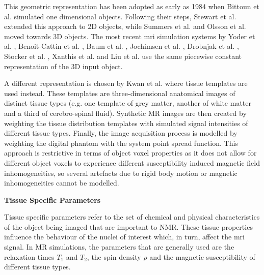 This geometric representation has been adopted as early as 1984 when Bittoun et al. \cite{Bittoun1984} simulated one dimensional objects.
Following their steps, Stewart et al. \cite{Stewart1986} extended this approach to 2D objects, while Summers et al. \cite{Summers1986} and Olsson et al. \cite{Olsson1995} moved towards 3D objects.
The most recent \ac{mri} simulation systems by 
Yoder et al. \cite{Yoder2004}, 
Benoit-Cattin et al. \cite{Benoit-Cattin2005}, 
Baum et al. \cite{Baum2011}, 
Jochimsen et al. \cite{Jochimsen2004} \cite{Jochimsen2006}, 
Drobnjak et al. \cite{Drobnjak2006} \cite{Drobnjak2010}, 
Stocker et al. \cite{Stocker2010}, 
Xanthis et al. \cite{Xanthis2014} and 
Liu et al. \cite{Liu2013} \cite{Liu2014} \cite{Liu2016} \cite{Liu2017} use the same piecewise constant representation of the 3D input object.

\hfill

A different representation is chosen by
Kwan et al. \cite{Kwan1997} \cite{Kwan1999}
where tissue templates \cite{Collins1995} are used instead.
These templates are three-dimensional anatomical images of distinct tissue types (e.g. one template of grey matter, another of white matter and a third of cerebro-spinal fluid). 
Synthetic MR images are then created by weighting the tissue distribution templates with simulated signal intensities of different tissue types.
Finally, the image acquisition process is modelled by weighting the digital phantom with the system point spread function.
This approach is restrictive in terms of object voxel properties as it does not allow for different object voxels to experience different susceptibility induced magnetic field inhomogeneities, so several artefacts due to rigid body motion or magnetic inhomogeneities cannot be modelled.

\hfill

\large \textbf{Tissue Specific Parameters} \normalsize

Tissue specific parameters refer to the set of chemical and physical characteristics of the object being imaged that are important to NMR.
These tissue properties influence the behaviour of the nuclei of interest which, in turn, affect the \ac{mri} signal.
In MR simulations, the parameters that are generally used are the relaxation times $T_1$ and $T_2$, the spin density $\rho$ and the magnetic susceptibility of different tissue types.

